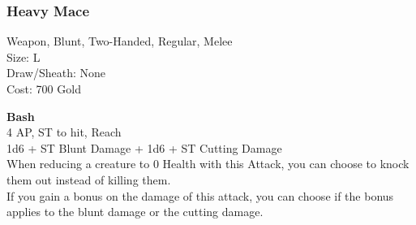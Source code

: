 \subsubsection{Heavy Mace}\label{weapon:heavyMace}
Weapon, Blunt, Two-Handed, Regular, Melee\\
Size: L\\
Draw/Sheath: None\\
Cost: 700 Gold

\textbf{Bash}\\
4 AP, ST to hit,  Reach\\
1d6 + \texttimes ST Blunt Damage + 1d6 + \texttimes ST Cutting Damage\\
When reducing a creature to 0 Health with this Attack, you can choose to knock them out instead of killing them.\\
If you gain a bonus on the damage of this attack, you can choose if the bonus applies to the blunt damage or the cutting damage.